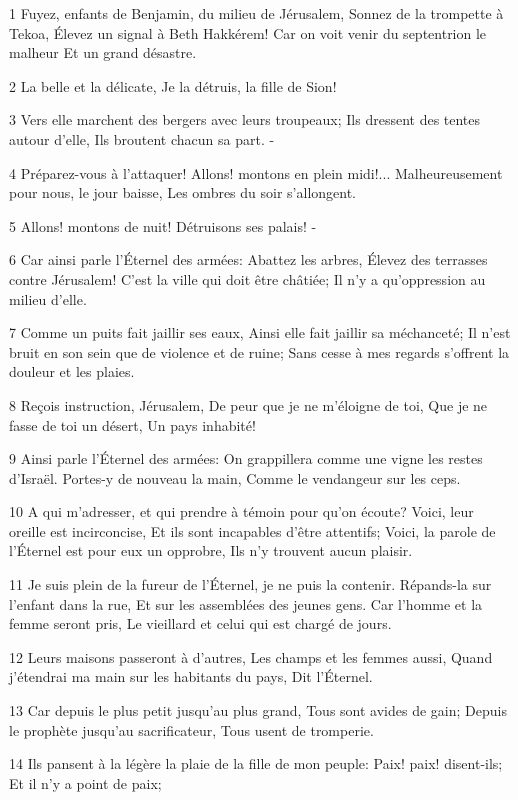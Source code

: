 \par 1 Fuyez, enfants de Benjamin, du milieu de Jérusalem, Sonnez de la trompette à Tekoa, Élevez un signal à Beth Hakkérem! Car on voit venir du septentrion le malheur Et un grand désastre.
\par 2 La belle et la délicate, Je la détruis, la fille de Sion!
\par 3 Vers elle marchent des bergers avec leurs troupeaux; Ils dressent des tentes autour d'elle, Ils broutent chacun sa part. -
\par 4 Préparez-vous à l'attaquer! Allons! montons en plein midi!... Malheureusement pour nous, le jour baisse, Les ombres du soir s'allongent.
\par 5 Allons! montons de nuit! Détruisons ses palais! -
\par 6 Car ainsi parle l'Éternel des armées: Abattez les arbres, Élevez des terrasses contre Jérusalem! C'est la ville qui doit être châtiée; Il n'y a qu'oppression au milieu d'elle.
\par 7 Comme un puits fait jaillir ses eaux, Ainsi elle fait jaillir sa méchanceté; Il n'est bruit en son sein que de violence et de ruine; Sans cesse à mes regards s'offrent la douleur et les plaies.
\par 8 Reçois instruction, Jérusalem, De peur que je ne m'éloigne de toi, Que je ne fasse de toi un désert, Un pays inhabité!
\par 9 Ainsi parle l'Éternel des armées: On grappillera comme une vigne les restes d'Israël. Portes-y de nouveau la main, Comme le vendangeur sur les ceps.
\par 10 A qui m'adresser, et qui prendre à témoin pour qu'on écoute? Voici, leur oreille est incirconcise, Et ils sont incapables d'être attentifs; Voici, la parole de l'Éternel est pour eux un opprobre, Ils n'y trouvent aucun plaisir.
\par 11 Je suis plein de la fureur de l'Éternel, je ne puis la contenir. Répands-la sur l'enfant dans la rue, Et sur les assemblées des jeunes gens. Car l'homme et la femme seront pris, Le vieillard et celui qui est chargé de jours.
\par 12 Leurs maisons passeront à d'autres, Les champs et les femmes aussi, Quand j'étendrai ma main sur les habitants du pays, Dit l'Éternel.
\par 13 Car depuis le plus petit jusqu'au plus grand, Tous sont avides de gain; Depuis le prophète jusqu'au sacrificateur, Tous usent de tromperie.
\par 14 Ils pansent à la légère la plaie de la fille de mon peuple: Paix! paix! disent-ils; Et il n'y a point de paix;
